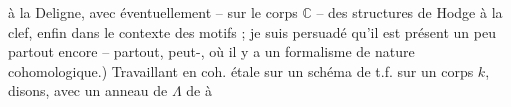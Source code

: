 à la Deligne, avec éventuellement -- sur le corps $\mathbb{C}$ -- des structures de Hodge à la clef, enfin dans le contexte des motifs ; je suis persuadé qu'il est présent
un peu partout encore -- partout, peut-, où il y a un formalisme de nature cohomologique.) Travaillant en coh. étale sur un schéma 
de t.f. sur un corps $k$, disons,
avec un anneau de  $\Lambda$ de   à  
